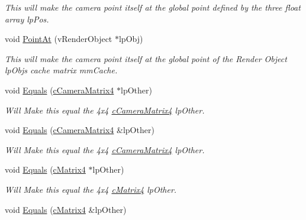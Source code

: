 \begin{DoxyCompactItemize}
\begin{DoxyCompactList}\small\item\em This will make the camera point itself at the global point defined by the three float array lpPos. \end{DoxyCompactList}\item 
\hypertarget{classc_camera_matrix4_a2a17ab7086abec91dc96a3ee2acffcc0}{
void \hyperlink{classc_camera_matrix4_a2a17ab7086abec91dc96a3ee2acffcc0}{PointAt} (vRenderObject $\ast$lpObj)}
\label{classc_camera_matrix4_a2a17ab7086abec91dc96a3ee2acffcc0}

\begin{DoxyCompactList}\small\item\em This will make the camera point itself at the global point of the Render Object lpObjs cache matrix mmCache. \end{DoxyCompactList}\item 
\hypertarget{classc_camera_matrix4_ac22d068fd30bfd2c5cb23dc06822f500}{
void \hyperlink{classc_camera_matrix4_ac22d068fd30bfd2c5cb23dc06822f500}{Equals} (\hyperlink{classc_camera_matrix4}{cCameraMatrix4} $\ast$lpOther)}
\label{classc_camera_matrix4_ac22d068fd30bfd2c5cb23dc06822f500}

\begin{DoxyCompactList}\small\item\em Will Make this equal the 4x4 \hyperlink{classc_camera_matrix4}{cCameraMatrix4} lpOther. \end{DoxyCompactList}\item 
\hypertarget{classc_camera_matrix4_a6ef73d4d654a0dcf9ffc146908bd88ed}{
void \hyperlink{classc_camera_matrix4_a6ef73d4d654a0dcf9ffc146908bd88ed}{Equals} (\hyperlink{classc_camera_matrix4}{cCameraMatrix4} \&lpOther)}
\label{classc_camera_matrix4_a6ef73d4d654a0dcf9ffc146908bd88ed}

\begin{DoxyCompactList}\small\item\em Will Make this equal the 4x4 \hyperlink{classc_camera_matrix4}{cCameraMatrix4} lpOther. \end{DoxyCompactList}\item 
\hypertarget{classc_camera_matrix4_ab6b4ff506c700a7e209dae84eb52d4ef}{
void \hyperlink{classc_camera_matrix4_ab6b4ff506c700a7e209dae84eb52d4ef}{Equals} (\hyperlink{classc_matrix4}{cMatrix4} $\ast$lpOther)}
\label{classc_camera_matrix4_ab6b4ff506c700a7e209dae84eb52d4ef}

\begin{DoxyCompactList}\small\item\em Will Make this equal the 4x4 \hyperlink{classc_matrix4}{cMatrix4} lpOther. \end{DoxyCompactList}\item 
\hypertarget{classc_camera_matrix4_a21037a9e876362aea2c9461f38e50304}{
void \hyperlink{classc_camera_matrix4_a21037a9e876362aea2c9461f38e50304}{Equals} (\hyperlink{classc_matrix4}{cMatrix4} \&lpOther)}
\label{classc_camera_matrix4_a21037a9e876362aea2c9461f38e50304}


\end{DoxyCompactItemize}
